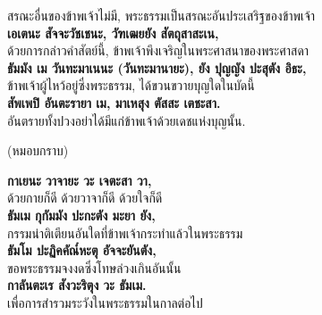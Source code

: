 \documentclass[12pt]{article}
\begin{document}
\indent สรณะอื่นของข้าพเจ้าไม่มี, พระธรรมเป็นสรณะอันประเสริฐของข้าพเจ้า\\
\textbf{เอเตนะ สัจจะวัชเชนะ, วัฑเฒยยัง สัตถุสาสะเน,}\\
\indent ด้วยการกล่าวคำสัตย์นี้, ข้าพเจ้าพึงเจริญในพระศาสนาของพระศาสดา\\
\textbf{ธัมมัง เม วันทะมาเนนะ (วันทะมานายะ), ยัง ปุญญัง ปะสุตัง อิธะ,}\\
\indent ข้าพเจ้าผู้ไหว้อยู่ซึ่งพระธรรม, ได้ขวนขวายบุญใดในบัดนี้\\
\textbf{สัพเพปิ อันตะรายา เม, มาเหสุง ตัสสะ เตชะสา.}\\
\indent อันตรายทั้งปวงอย่าได้มีแก่ข้าพเจ้าด้วยเดชแห่งบุญนั้น.
\begin{center}
(หมอบกราบ)
\end{center}
\textbf{กาเยนะ วาจายะ วะ เจตะสา วา,}\\
\indent ด้วยกายก็ดี ด้วยวาจาก็ดี ด้วยใจก็ดี\\
\textbf{ธัมเม กุกัมมัง ปะกะตัง มะยา ยัง,}\\
\indent กรรมน่าติเตียนอันใดที่ข้าพเจ้ากระทำแล้วในพระธรรม\\
\textbf{ธัมโม ปะฏิคคัณ๎หะตุ อัจจะยันตัง,}\\
\indent ขอพระธรรมจงงดซึ่งโทษล่วงเกินอันนั้น\\
\textbf{กาลันตะเร สังวะริตุง วะ ธัมเม.}\\
\indent เพื่อการสำรวมระวังในพระธรรมในกาลต่อไป\\
\end{document}
